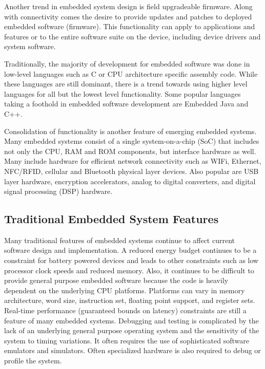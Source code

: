 \documentclass[draftcls,onecolumn,conference,12pt]{IEEEtran}
\begin{document}
Another trend in embedded system design is field upgradeable firmware.  Along with connectivity comes the desire to provide updates and patches to deployed embedded software (firmware).  This functionality can apply to applications and features or to the entire software suite on the device, including device drivers and system software.

Traditionally, the majority of development for embedded software was done in low-level languages such as C or CPU architecture specific assembly code.  While these languages are still dominant, there is a trend towards using higher level languages for all but the lowest level functionality.  Some popular languages taking a foothold in embedded software development are Embedded Java and C++.

Consolidation of functionality is another feature of emerging embedded systems.  Many embedded systems consist of a single system-on-a-chip (SoC) that includes not only the CPU, RAM and ROM components, but interface hardware as well.  Many include hardware for efficient network connectivity such as WIFi, Ethernet, NFC/RFID, cellular and Bluetooth physical layer devices.  Also popular are USB layer hardware, encryption accelerators, analog to digital converters, and digital signal processing (DSP) hardware.

\subsection{Traditional Embedded System Features}

Many traditional features of embedded systems continue to affect current software design and implementation.  A reduced energy budget continues to be a constraint for battery powered devices and leads to other constraints such as low processor clock speeds and reduced memory.  Also, it continues to be difficult to provide general purpose embedded software because the code is heavily dependent on the underlying CPU platforms.  Platforms can vary in memory architecture, word size, instruction set,  floating point support, and register sets.  Real-time performance (guaranteed bounds on latency) constraints are still a feature of many embedded systems. Debugging and testing is complicated by the lack of an underlying general purpose operating system and the sensitivity of the system to timing variations.  It often requires the use of sophisticated software emulators and simulators.   Often specialized hardware is also required to debug or profile the system.
\end{document}
